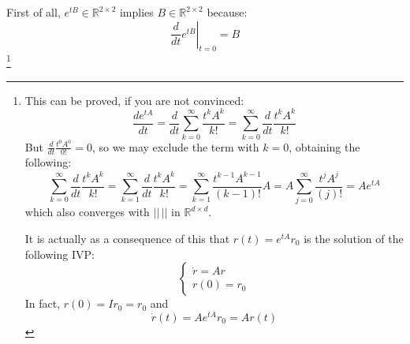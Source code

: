 \begin{example}
    First of all, $e^{tB}\in\mathbb{R}^{2\times 2}$ implies $B\in\mathbb{R}^{2\times 2}$ because:
    \begin{equation*}
    \left.\frac{d}{dt}e^{tB}\right|_{t=0}=B
    \end{equation*}\footnote{This can be proved, if you are not convinced:
    \begin{equation*}
        \frac{de^{tA}}{dt}=\frac{d}{dt}\sum_{k=0}^{\infty}\frac{t^kA^k}{k!}=\sum_{k=0}^{\infty}\frac{d}{dt}\frac{t^kA^k}{k!}
    \end{equation*}
    But $\frac{d}{dt}\frac{t^0A^0}{0!}=0$, so we may exclude the term with $k=0$, obtaining the following:
    \begin{equation*}
        \sum_{k=0}^{\infty}\frac{d}{dt}\frac{t^kA^k}{k!}=\sum_{k=1}^{\infty}\frac{d}{dt}\frac{t^kA^k}{k!}=\sum_{k=1}^{\infty}\frac{t^{k-1}A^{k-1}}{(k-1)!}A=A\sum_{j=0}^{\infty}\frac{t^{j}A^{j}}{(j)!}=Ae^{tA}
    \end{equation*}
    which also converges with $||\,||$ in $\mathbb{R}^{d\times d}$.

    It is actually as a consequence of this that $r(t)=e^{tA}r_0$ is the solution of the following IVP:\begin{equation*}
        \begin{cases}
            \dot{r}=Ar \\
            r(0)=r_0
        \end{cases}
    \end{equation*}
    In fact, $r(0)=Ir_0=r_0$ and \begin{equation*}
        \dot{r}(t)=Ae^{tA}r_0=Ar(t)
    \end{equation*}
    }


\end{example}
